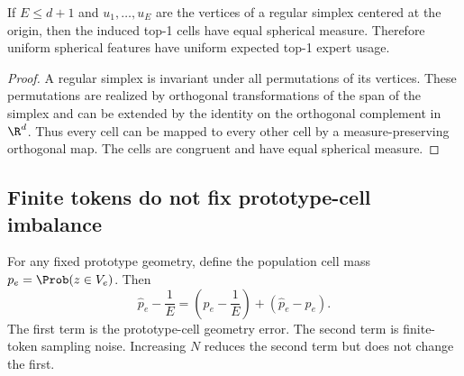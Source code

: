 \begin{corollary}
If $E\le d+1$ and $u_1,\ldots,u_E$ are the vertices of a regular simplex
centered at the origin, then the induced top-1 cells have equal spherical
measure. Therefore uniform spherical features have uniform expected top-1
expert usage.
\end{corollary}

\begin{proof}
A regular simplex is invariant under all permutations of its vertices. These
permutations are realized by orthogonal transformations of the span of the
simplex and can be extended by the identity on the orthogonal complement in
$\R^d$. Thus every cell can be mapped to every other cell by a measure-preserving
orthogonal map. The cells are congruent and have equal spherical measure.
\end{proof}

\subsection{Finite tokens do not fix prototype-cell imbalance}

For any fixed prototype geometry, define the population cell mass
$p_e=\Prob(z\in V_e)$. Then
\begin{equation}
 \widehat p_e-\frac{1}{E}
 =
 \left(p_e-\frac{1}{E}\right)
 +
 \left(\widehat p_e-p_e\right).
\end{equation}
The first term is the prototype-cell geometry error. The second term is
finite-token sampling noise. Increasing $N$ reduces the second term but does not
change the first.
